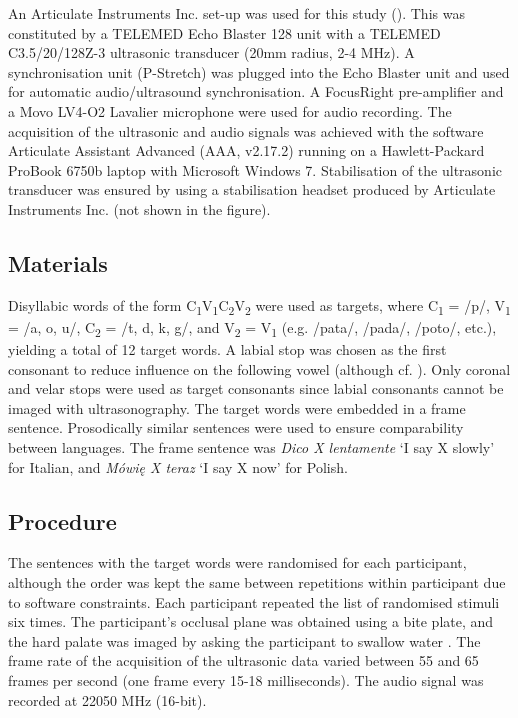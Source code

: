 \documentclass[authoryear, twocolumn]{elsarticle}
\begin{document}
An Articulate Instruments Inc. set-up was used for this study
(). This was constituted by a TELEMED Echo Blaster 128
unit with a TELEMED C3.5/20/128Z-3 ultrasonic transducer (20mm radius,
2-4 MHz). A synchronisation unit (P-Stretch) was plugged into the Echo
Blaster unit and used for automatic audio/ultrasound synchronisation. A
FocusRight pre-amplifier and a Movo LV4-O2 Lavalier microphone were used
for audio recording. The acquisition of the ultrasonic and audio signals
was achieved with the software Articulate Assistant Advanced (AAA,
v2.17.2) running on a Hawlett-Packard ProBook 6750b laptop with
Microsoft Windows 7. Stabilisation of the ultrasonic transducer was
ensured by using a stabilisation headset produced by Articulate
Instruments Inc. (not shown in the figure).

\subsection{Materials}\label{materials}

Disyllabic words of the form
C\textsubscript{1}V\textsubscript{1}C\textsubscript{2}V\textsubscript{2}
were used as targets, where C\textsubscript{1} = /p/, V\textsubscript{1}
= /a, o, u/, C\textsubscript{2} = /t, d, k, g/, and V\textsubscript{2} =
V\textsubscript{1} (e.g. /pata/, /pada/, /poto/, etc.), yielding a total
of 12 target words. A labial stop was chosen as the first consonant to
reduce influence on the following vowel (although cf.
\citealt{vazquez-alvarez2007}). Only coronal and velar stops were used
as target consonants since labial consonants cannot be imaged with
ultrasonography. The target words were embedded in a frame sentence.
Prosodically similar sentences were used to ensure comparability between
languages. The frame sentence was \emph{Dico X lentamente} `I say X
slowly' for Italian, and \emph{Mówię X teraz} `I say X now' for Polish.

\subsection{Procedure}\label{procedure}

The sentences with the target words were randomised for each
participant, although the order was kept the same between repetitions
within participant due to software constraints. Each participant
repeated the list of randomised stimuli six times. The participant's
occlusal plane was obtained using a bite plate, and the hard palate was
imaged by asking the participant to swallow water \citep{scobbie2011}.
The frame rate of the acquisition of the ultrasonic data varied between
55 and 65 frames per second (one frame every 15-18 milliseconds). The
audio signal was recorded at 22050 MHz (16-bit).
\end{document}

